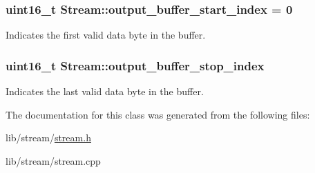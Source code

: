 \subsubsection[{\texorpdfstring{output\+\_\+buffer\+\_\+start\+\_\+index}{output_buffer_start_index}}]{\setlength{\rightskip}{0pt plus 5cm}uint16\+\_\+t Stream\+::output\+\_\+buffer\+\_\+start\+\_\+index = 0\hspace{0.3cm}{\ttfamily [protected]}}\hypertarget{class_stream_a1b2d63accede402e5c4c7fd3747d4c33}{}\label{class_stream_a1b2d63accede402e5c4c7fd3747d4c33}
Indicates the first valid data byte in the buffer. 
\subsubsection[{\texorpdfstring{output\+\_\+buffer\+\_\+stop\+\_\+index}{output_buffer_stop_index}}]{\setlength{\rightskip}{0pt plus 5cm}uint16\+\_\+t Stream\+::output\+\_\+buffer\+\_\+stop\+\_\+index\hspace{0.3cm}{\ttfamily [protected]}}\hypertarget{class_stream_a39d177eedd4d5ff28a95cca9131daf4c}{}\label{class_stream_a39d177eedd4d5ff28a95cca9131daf4c}
Indicates the last valid data byte in the buffer. 

The documentation for this class was generated from the following files\+:\begin{DoxyCompactItemize}
\item 
lib/stream/\hyperlink{stream_8h}{stream.\+h}\item 
lib/stream/stream.\+cpp\end{DoxyCompactItemize}
